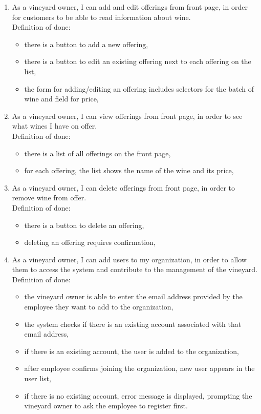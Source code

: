 \begin{enumerate}
	\item As a vineyard owner, I can add and edit offerings from front page, in order for customers to be able to read information about wine.
	\\Definition of done:
	\begin{itemize}
		\item there is a button to add a new offering,
		\item there is a button to edit an existing offering next to each offering on the list,
		\item the form for adding/editing an offering includes selectors for the batch of wine and field for price,
	\end{itemize}
	\item As a vineyard owner, I can view offerings from front page, in order to see what wines I have on offer.
	\\Definition of done:
	\begin{itemize}
		\item there is a list of all offerings on the front page,
		\item for each offering, the list shows the name of the wine and its price,
	\end{itemize}
	\item As a vineyard owner, I can delete offerings from front page, in order to remove wine from offer.
	\\Definition of done:
	\begin{itemize}
		\item there is a button to delete an offering,
		\item deleting an offering requires confirmation,
	\end{itemize}

	\item As a vineyard owner, I can add users to my organization, in order to allow them to access the system and contribute to the management of the vineyard.
	\\Definition of done:
	\begin{itemize}
		\item the vineyard owner is able to enter the email address provided by the employee they want to add to the organization, 
		\item the system checks if there is an existing account associated with that email address,
		\item if there is an existing account, the user is added to the organization,
		\item after employee confirms joining the organization, new user appears in the user list,
		\item if there is no existing account, error message is displayed, prompting the vineyard owner to ask the employee to register first.
	\end{itemize}
	

\end{enumerate}
